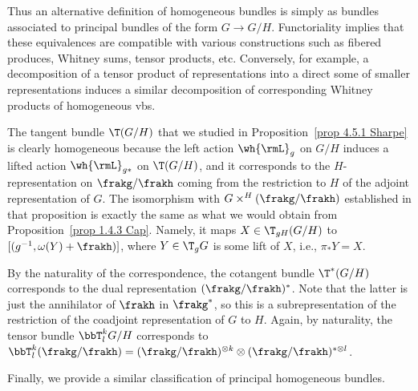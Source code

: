 Thus an alternative definition of homogeneous bundles is simply as bundles associated to principal bundles of the form $G\to G\slash H$. Functoriality implies that these equivalences are compatible with various constructions such as fibered produces, Whitney sums, tensor products, etc. Conversely, for example, a decomposition of a tensor product of representations into a direct some of smaller representations induces a similar decomposition of corresponding Whitney products of homogeneous \glspl{vb}.

\begin{example}\label{ex 1.4.3 Cap}
    The  tangent  bundle $\T(G\slash H)$ that we studied in Proposition~\ref{prop 4.5.1 Sharpe} is clearly homogeneous because the left action $\wh{\rmL}_g$ on $G\slash H$ induces a lifted action $\wh{\rmL}_{g\ast}$ on $\T(G\slash H)$, and it corresponds to the $H$-representation on $\frakg\slash \frakh$ coming from the restriction to $H$ of the adjoint representation of $G$. The isomorphism with $G\times^H (\frakg\slash\frakh)$ established in that proposition is exactly the same as what we would obtain from Proposition~\ref{prop 1.4.3 Cap}. Namely, it maps $X\in \T_{gH}(G\slash H)$ to $[(g^{-1},\omega(Y)+\frakh)]$, where $Y\in \T_g G$ is some lift of $X$, i.e., $\pi_\ast Y=X$.

    By the naturality of the correspondence, the cotangent bundle $\T^\ast(G\slash H)$ corresponds to the dual representation $(\frakg\slash\frakh)^\ast$. Note that the latter is just the annihilator of $\frakh$ in $\frakg^\ast$, so this is a subrepresentation of the restriction of the coadjoint representation of $G$ to $H$. Again, by naturality, the tensor bundle $\bbT^k_l G\slash H$ corresponds to $\bbT^k_l(\frakg\slash\frakh)=(\frakg\slash\frakh)^{\otimes k}\otimes (\frakg\slash\frakh)^{\ast\otimes l}$.
\end{example}


Finally, we provide a similar classification of principal homogeneous bundles.

